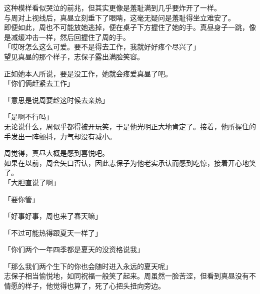 这种模样看似哭泣的前兆，但其实更像是羞耻满到几乎要炸开了一样。\\

与周对上视线后，真昼立刻垂下了眼睛，这毫无疑问是羞耻得坐立难安了。\\

即便如此，周也不可能放她逃掉，便在桌子下方握住了她的手。真昼身子一跳，像是减缓冲击一样，然后回握住了周的手。\\

「哎呀怎么这么可爱。要不是得去工作，我就好好疼个尽兴了」\\

望见真昼的那个样子，志保子露出满脸笑容。

正如她本人所说，要是没工作，她就会疼爱真昼了吧。\\

「你们俩赶紧去工作」

「意思是说周要趁这时候去亲热」

「是啊不行吗」\\

无论说什么，周似乎都得被开玩笑，于是他光明正大地肯定了。接着，他所握住的手发出一阵颤抖，力气却没有减小。

周觉得，真昼大概是感到喜悦吧。\\

如果在以前，周会矢口否认，因此志保子为他老实承认而感到吃惊，接着开心地笑了。\\

「大胆直说了啊」

「要你管」

「好事好事，周也来了春天嘛」

「不过可能热得跟夏天一样了」

「你们两个一年四季都是夏天的没资格说我」

「那么我们两个生下的你也会随时进入永远的夏天呢」\\

志保子相当愉悦地，如同祝福一般笑了起来。周虽然一脸苦涩，但看到真昼没有不情愿的样子，他觉得也算了，死了心把头扭向旁边。
